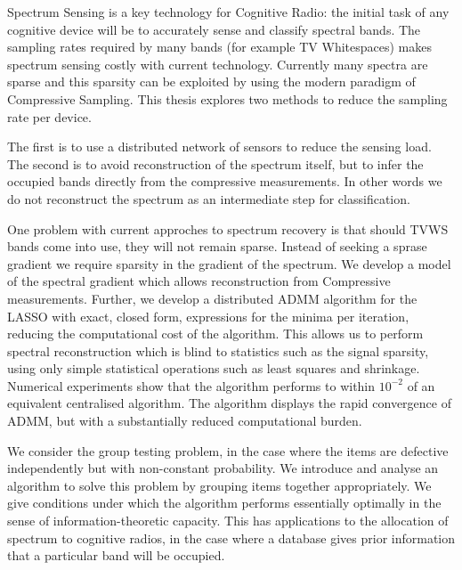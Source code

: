 Spectrum Sensing is a key technology for Cognitive Radio: the initial task of any cognitive device will be to accurately sense and classify spectral bands. The sampling rates required by many bands (for example TV Whitespaces) makes spectrum sensing costly with current technology. Currently many spectra are sparse and this sparsity can be exploited by using the modern paradigm of Compressive Sampling. This thesis explores two methods to reduce the sampling rate per device.

The first is to use a distributed network of sensors to reduce the sensing load. The second is to avoid reconstruction of the spectrum itself, but to infer the occupied bands directly from the compressive measurements. In other words we do not reconstruct the spectrum as an intermediate step for classification.

One problem with current approches to spectrum recovery is that should TVWS bands come into use, they will not remain sparse. Instead of seeking a sprase gradient we require sparsity in the gradient of the spectrum. We develop a model of the spectral gradient which allows reconstruction from Compressive measurements. Further, we develop a distributed ADMM algorithm for the LASSO with exact, closed form, expressions for the minima per iteration, reducing the computational cost of the algorithm. This allows us to perform spectral reconstruction which is blind to statistics such as the signal sparsity, using only simple statistical operations such as least squares and shrinkage. Numerical experiments show that the algorithm performs to within \(10^{-2}\) of an equivalent centralised algorithm. The algorithm displays the rapid convergence of ADMM, but with a substantially reduced computational burden.

We consider the group testing problem, in the case where the items are defective independently but with non-constant probability.
We introduce and analyse an algorithm to solve this problem by grouping items together appropriately. We give conditions under which  the
algorithm performs essentially optimally in the sense of information-theoretic capacity.
This has applications to the allocation of spectrum to cognitive radios, in the case where a database gives prior information that a particular band will be occupied.